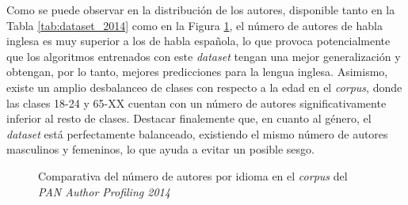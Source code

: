 \bigskip
Como se puede observar en la distribución de los autores, disponible tanto en la Tabla \ref{tab:dataset_2014} como en la Figura \ref{fig:dataset_2014}, el número de autores de habla inglesa
es muy superior a los de habla española, lo que provoca potencialmente que los algoritmos entrenados con este \textit{dataset} tengan una mejor generalización y obtengan, por lo tanto,
mejores predicciones para la lengua inglesa. Asimismo, existe un amplio desbalanceo de clases con respecto a la edad en el \textit{corpus},
donde las clases 18-24 y 65-XX cuentan con un número de autores significativamente inferior al resto de clases. Destacar finalemente que,
en cuanto al género, el \textit{dataset} está perfectamente balanceado, existiendo el mismo número de autores masculinos y femeninos, lo que
ayuda a evitar un posible sesgo.

\bigskip
\begin{figure}[H]
	\centering
	\caption{Comparativa del número de autores por idioma en el \textit{corpus} del \textit{PAN Author Profiling 2014}}
	\label{fig:dataset_2014}
\end{figure}

